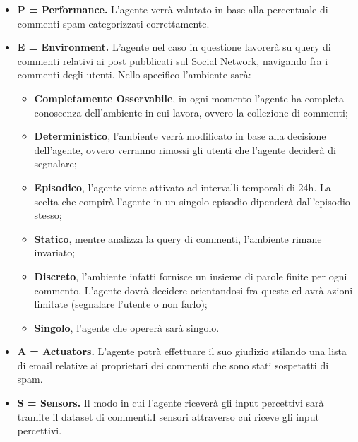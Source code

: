 \documentclass{report}
\begin{document}
    \begin{itemize}
        \item 
        {\bfseries P = Performance.} 
        L'agente verrà valutato in base alla percentuale di commenti spam categorizzati correttamente.
        \item 
        {\bfseries E = Environment.} L'agente nel caso in questione lavorerà su query di commenti relativi ai post pubblicati sul Social Network, 
        navigando fra i commenti degli utenti.\newline
        Nello specifico l'ambiente sarà:
            \begin{itemize}
                \item {\bfseries Completamente Osservabile}, in ogni momento l'agente ha completa conoscenza
                dell'ambiente in cui lavora, ovvero la collezione di commenti;
                \item {\bfseries Deterministico}, l'ambiente verrà modificato in base alla decisione dell'agente, 
                ovvero verranno rimossi gli utenti che l'agente deciderà di segnalare;
                \item {\bfseries Episodico}, l'agente viene attivato ad intervalli temporali di 24h. La scelta che
                compirà l'agente in un singolo episodio dipenderà dall'episodio stesso;
                \item {\bfseries Statico}, mentre analizza la query di commenti, l'ambiente rimane invariato;
                \item {\bfseries Discreto}, l'ambiente infatti fornisce un insieme di parole finite per ogni commento. L'agente
                dovrà decidere orientandosi fra queste ed avrà azioni limitate (segnalare l'utente o non farlo); 
                \item {\bfseries Singolo}, l'agente che opererà sarà singolo.
            \end{itemize}
          
        \item 
        {\bfseries A = Actuators.} L'agente potrà effettuare il suo giudizio stilando una lista di email relative ai proprietari dei commenti che sono stati sospetatti di spam.
        \item 
        {\bfseries S = Sensors.} Il modo in cui l'agente riceverà gli input percettivi sarà tramite il dataset di commenti.I sensori attraverso cui riceve gli input percettivi.


        
      \end{itemize}
    
\end{document}
